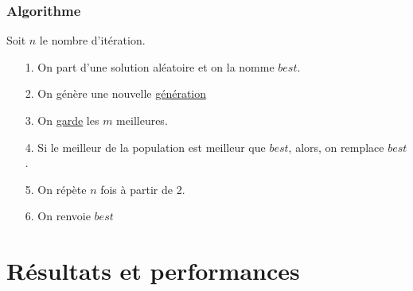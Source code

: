 \documentclass[11pt,french]{report}
\begin{document}
	\subsubsection{Algorithme}
	Soit $n$ le nombre d'itération.
	
	\begin{itemize}
		\item[1.] On part d'une solution aléatoire et on la nomme $best$.
		\item[2.] On génère une nouvelle \hyperref[Génération]{génération}
		\item[3.] On \hyperref[sélection]{garde} les $m$ meilleures.
		\item[4.] Si le meilleur de la population est meilleur que $best$, alors, on remplace $best$.
		\item[5.] On répète $n$ fois à partir de 2.
		\item[6.] On renvoie $best$
	\end{itemize}
	
	
	\section{Résultats et performances}
\end{document}
